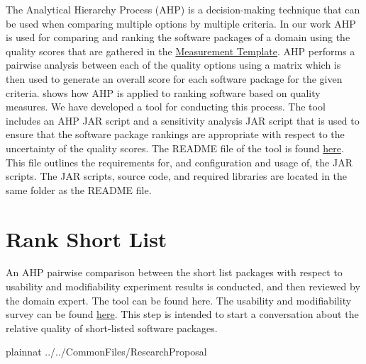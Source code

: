 \documentclass[letterpaper,cleveref]{lipics-v2019}
\theoremstyle{definition}
\begin{document}
The Analytical Hierarchy Process (AHP) is a decision-making technique that can
be used when comparing multiple options by multiple criteria. In our work AHP is
used for comparing and ranking the software packages of a domain using the
quality scores that are gathered in the
\href{https://github.com/smiths/AIMSS/blob/master/StateOfPractice/Methodology/Combined_MeasurementTemplate_EmpiricalMeasures.xlsx}
{Measurement Template}. AHP performs a pairwise analysis between each of the
quality options using a matrix which is then used to generate an overall score
for each software package for the given criteria. \cite{SmithEtAl2016} shows how
AHP is applied to ranking software based on quality measures. We have developed
a tool for conducting this process. The tool includes an AHP JAR script and a
sensitivity analysis JAR script that is used to ensure that the software package
rankings are appropriate with respect to the uncertainty of the quality
scores. The README file of the tool is found
\href{https://github.com/smiths/AIMSS/blob/master/StateOfPractice/AHP2020/LBM/README.txt}{here}. This
file outlines the requirements for, and configuration and usage of, the JAR
scripts. The JAR scripts, source code, and required libraries are located in the
same folder as the README file.

\section{Rank Short List} \label{SecRankShortList}

An AHP pairwise comparison between the short list packages with respect to
usability and modifiability experiment results is conducted, and then reviewed by the domain expert. The tool can be found here. The usability and modifiability
survey can be found
\href{https://github.com/smiths/AIMSS/blob/master/StateOfPractice/Methodology/Experiments.pdf}
{here}. This step is intended to start a conversation about the relative quality
of short-listed software packages.

\newpage

\appendix

\newpage

 {plainnat}
 {../../CommonFiles/ResearchProposal}
\end{document}
